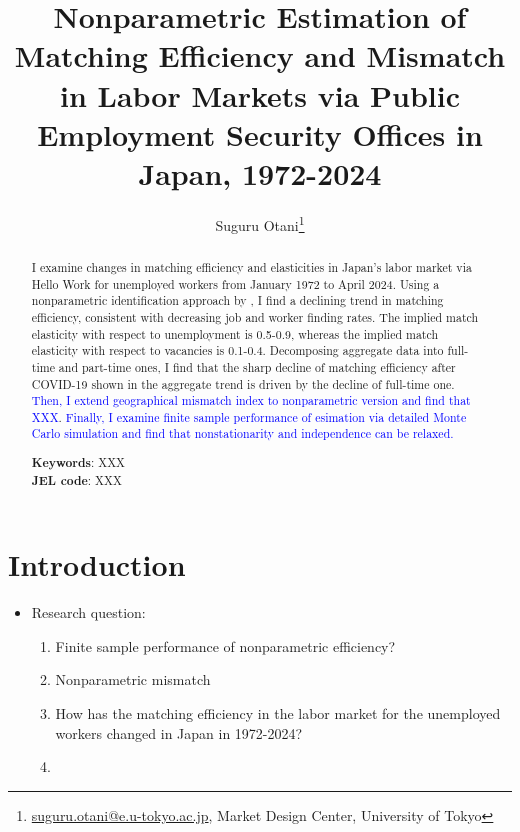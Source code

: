 \documentclass[12pt]{article}
\begin{document}
\title{Nonparametric Estimation of Matching Efficiency and Mismatch in Labor Markets via Public Employment Security Offices in Japan, 1972-2024}
\author{Suguru Otani\thanks{\href{mailto:}{suguru.otani@e.u-tokyo.ac.jp}, Market Design Center, University of Tokyo}}
\maketitle

\begin{abstract}
\noindent

I examine changes in matching efficiency and elasticities in Japan's labor market via Hello Work for unemployed workers from January 1972 to April 2024. 
Using a nonparametric identification approach by \cite{lange2020beyond}, I find a declining trend in matching efficiency, consistent with decreasing job and worker finding rates. 
The implied match elasticity with respect to unemployment is 0.5-0.9, whereas the implied match elasticity with respect to vacancies is 0.1-0.4.
Decomposing aggregate data into full-time and part-time ones, I find that the sharp decline of matching efficiency after COVID-19 shown in the aggregate trend is driven by the decline of full-time one.
\textcolor{blue}{Then, I extend geographical mismatch index to nonparametric version and find that XXX}.
\textcolor{blue}{Finally, I examine finite sample performance of esimation via detailed Monte Carlo simulation and find that nonstationarity and independence can be relaxed.}

\textbf{Keywords}: XXX \\
\textbf{JEL code}: XXX
\end{abstract}

\section{Introduction}

\begin{itemize}
    \item Research question: 
    \begin{enumerate}
        \item Finite sample performance of nonparametric efficiency?
        \item Nonparametric mismatch
        \item How has the matching efficiency in the labor market for the unemployed workers changed in Japan in 1972-2024?
        \item \cite{patterson2016working}
    \end{enumerate}
\end{itemize}
\end{document}
